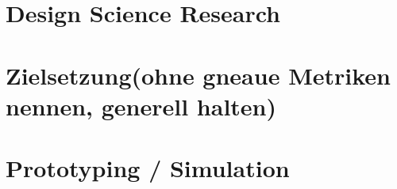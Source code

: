 \section{Design Science Research }
\section{Zielsetzung(ohne gneaue Metriken nennen, generell halten)}
\section{Prototyping / Simulation}

